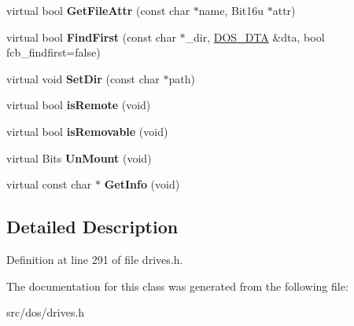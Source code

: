 \begin{DoxyCompactItemize}
\item 
\hypertarget{classphysfscdromDrive_ab912fc3e100db700805d05cd06716630}{virtual bool {\bfseries Get\-File\-Attr} (const char $\ast$name, Bit16u $\ast$attr)}\label{classphysfscdromDrive_ab912fc3e100db700805d05cd06716630}

\item 
\hypertarget{classphysfscdromDrive_ae13118f6b51622e933dc536ecea57258}{virtual bool {\bfseries Find\-First} (const char $\ast$\-\_\-dir, \hyperlink{classDOS__DTA}{D\-O\-S\-\_\-\-D\-T\-A} \&dta, bool fcb\-\_\-findfirst=false)}\label{classphysfscdromDrive_ae13118f6b51622e933dc536ecea57258}

\item 
\hypertarget{classphysfscdromDrive_ac73dc48b4346379edcdc2c42c502380a}{virtual void {\bfseries Set\-Dir} (const char $\ast$path)}\label{classphysfscdromDrive_ac73dc48b4346379edcdc2c42c502380a}

\item 
\hypertarget{classphysfscdromDrive_a39c3bc30452a8ecea465111831e5e7a6}{virtual bool {\bfseries is\-Remote} (void)}\label{classphysfscdromDrive_a39c3bc30452a8ecea465111831e5e7a6}

\item 
\hypertarget{classphysfscdromDrive_a2fd25800d56f447a0ec1550ec90a24ff}{virtual bool {\bfseries is\-Removable} (void)}\label{classphysfscdromDrive_a2fd25800d56f447a0ec1550ec90a24ff}

\item 
\hypertarget{classphysfscdromDrive_a99c7363ec5b3a0ca597c10e4f6dc2ecc}{virtual Bits {\bfseries Un\-Mount} (void)}\label{classphysfscdromDrive_a99c7363ec5b3a0ca597c10e4f6dc2ecc}

\item 
\hypertarget{classphysfscdromDrive_ad222bd4e5f133f63e2dd3713384298b8}{virtual const char $\ast$ {\bfseries Get\-Info} (void)}\label{classphysfscdromDrive_ad222bd4e5f133f63e2dd3713384298b8}

\end{DoxyCompactItemize}


\subsection{Detailed Description}


Definition at line 291 of file drives.\-h.



The documentation for this class was generated from the following file\-:\begin{DoxyCompactItemize}
\item 
src/dos/drives.\-h\end{DoxyCompactItemize}
